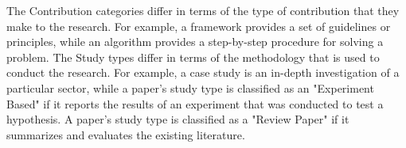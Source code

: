 The Contribution categories differ in terms of the type of contribution that they make to the research. For example, a framework provides a set of guidelines or principles, while an algorithm provides a step-by-step procedure for solving a problem. The Study types differ in terms of the methodology that is used to conduct the research. For example, a case study is an in-depth investigation of a particular sector, while a paper's study type is classified as an "Experiment Based" if it reports the results of an experiment that was conducted to test a hypothesis. A paper's study type is classified as a "Review Paper" if it summarizes and  evaluates the existing literature.

